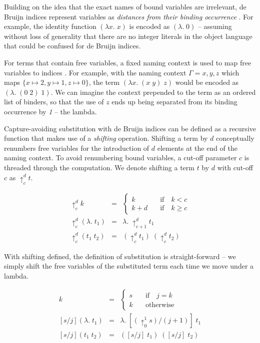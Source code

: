 \documentclass[]{unswthesis}
\let\i\textit
\begin{document}
Building on the idea that the exact names of bound variables are irrelevant, de Bruijn indices represent variables as \i{distances from their binding occurrence} \cite{deBruijn72}. For example, the identity function $(\lambda x. \; x)$ is encoded as $(\lambda . \; 0)$ -- assuming without loss of generality that there are no integer literals in the object language that could be confused for de Bruijn indices.

For terms that contain free variables, a fixed naming context is used to map free variables to indices \cite{tapl}. For example, with the naming context $\Gamma = x, y, z$ which maps $\{x \mapsto 2, y \mapsto 1, z \mapsto 0\}$, the term $(\lambda x. \; (x \; y) \; z)$ would be encoded as $(\lambda. \; (0 \; 2) \; 1)$. We can imagine the context prepended to the term as an ordered list of binders, so that the use of $z$ ends up being separated from its binding occurrence by \i{1} -- the lambda.

Capture-avoiding substitution with de Bruijn indices can be defined as a recursive function that makes use of a \i{shifting} operation. Shifting a term by $d$ conceptually renumbers free variables for the introduction of $d$ elements at the end of the naming context. To avoid renumbering bound variables, a cut-off parameter $c$ is threaded through the computation. We denote shifting a term $t$ by $d$ with cut-off $c$ as $\uparrow^d_c t$.

\begin{eqnarray*}
\uparrow^d_c k & = &
	\begin{cases}
	k \quad & \text{if} \quad k < c \\
	k + d \quad & \text{if} \quad k \geq c
	\end{cases}\\
\uparrow^d_c (\lambda. \; t_1) & = & \lambda. \; \uparrow^d_{c + 1} t_1\\
\uparrow^d_c (t_1 \; t_2) & = & (\uparrow^d_c t_1) \; (\uparrow^d_c t_2)
\end{eqnarray*}

With shifting defined, the definition of substitution is straight-forward -- we simply shift the free variables of the substituted term each time we move under a lambda.

\begin{eqnarray*}
[s/j]k & = &
	\begin{cases}
	s \quad & \text{if} \quad j = k \\
	k \quad & \text{otherwise}
	\end{cases}\\
\left[s/j\right](\lambda. \; t_1) & = & \lambda. \; [(\uparrow^1_0 s)/(j + 1)] \; t_1\\
\left[s/j\right](t_1 \; t_2) & = & ([s/j] \; t_1) \; ([s/j] \; t_2)
\end{eqnarray*}
\end{document}
